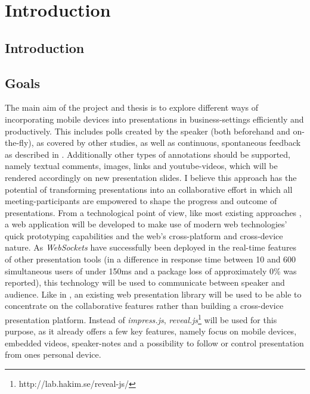 \chapter{Introduction}
\label{cha:introduction}

\section{Introduction}


\section{Goals}
The main aim of the project and thesis is to explore different ways of incorporating mobile devices into presentations in business-settings efficiently and productively. This includes polls created by the speaker (both beforehand and on-the-fly), as covered by other studies, as well as continuous, spontaneous feedback as described in \cite{Teevan:MobileFeedbackDuringPresentation}. Additionally other types of annotations should be supported, namely textual comments, images, links and youtube-videos, which will be rendered accordingly on new presentation slides. I believe this approach has the potential of transforming presentations into an collaborative effort in which all meeting-participants are empowered to shape the progress and outcome of presentations. From a technological point of view, like most existing approaches \cite{Bry:Backstage, Cheng:TreebasedOnlinePresentations, Esponda:ElectronicVotingOnTheFly, Inoue:RealTimeQuestionnaire, Teevan:MobileFeedbackDuringPresentation, Triglianos:InteractiveWebPresentationsImpress}, a web application will be developed to make use of modern web technologies' quick prototyping capabilities and the web's cross-platform and cross-device nature. As \emph{WebSockets} have successfully been deployed in the real-time features of other presentation tools \cite{Inoue:RealTimeQuestionnaire, Triglianos:InteractiveWebPresentationsImpress} (in \cite{Inoue:RealTimeQuestionnaire} a difference in response time between 10 and 600 simultaneous users of under 150ms and a package loss of approximately 0\% was reported), this technology will be used to communicate between speaker and audience. Like in \cite{Triglianos:InteractiveWebPresentationsImpress}, an existing web presentation library will be used to be able to concentrate on the collaborative features rather than building a cross-device presentation platform. Instead of \emph{impress.js}, \emph{reveal.js}\footnote{http://lab.hakim.se/reveal-js/} will be used for this purpose, as it already offers a few key features, namely focus on mobile devices, embedded videos, speaker-notes and a possibility to follow or control presentation from ones personal device.